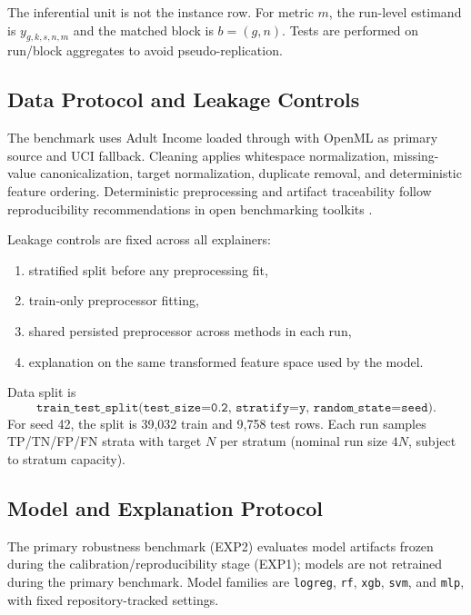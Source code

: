 \documentclass[twoside,11pt]{article}
\begin{document}
The inferential unit is not the instance row. For metric $m$, the run-level
estimand is $y_{g,k,s,n,m}$ and the matched block is $b=(g,n)$. Tests are
performed on run/block aggregates to avoid pseudo-replication.

\subsection{Data Protocol and Leakage Controls}
\label{sec:methods-data}
The benchmark uses Adult Income loaded through
 with OpenML as primary source and UCI fallback.
Cleaning applies whitespace normalization, missing-value canonicalization,
target normalization, duplicate removal, and deterministic feature ordering.
Deterministic preprocessing and artifact traceability follow reproducibility
recommendations in open benchmarking toolkits
\citep{agarwal2022openxai,hedstrom2023quantus}.

Leakage controls are fixed across all explainers:
\begin{enumerate}[leftmargin=*]
    \item stratified split before any preprocessing fit,
    \item train-only preprocessor fitting,
    \item shared persisted preprocessor across methods in each run,
    \item explanation on the same transformed feature space used by the model.
\end{enumerate}

Data split is
\[
\texttt{train\_test\_split(test\_size=0.2,\ stratify=y,\ random\_state=seed)}.
\]
For seed 42, the split is 39,032 train and 9,758 test rows. Each run samples
TP/TN/FP/FN strata with target $N$ per stratum (nominal run size $4N$, subject
to stratum capacity).

\subsection{Model and Explanation Protocol}
\label{sec:methods-protocol}
The primary robustness benchmark (EXP2) evaluates model artifacts frozen during
the calibration/reproducibility stage (EXP1); models are not retrained during
the primary benchmark. Model families are \texttt{logreg}, \texttt{rf}, \texttt{xgb},
\texttt{svm}, and \texttt{mlp}, with fixed repository-tracked settings.
\end{document}
